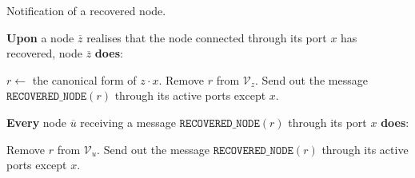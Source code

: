 \begin{algorithm}[htbp]
\caption{Notification of a recovered node.}
\label{al:nrecovery_notif}
\textbf{Upon} a node $\overline{z}$ realises that the node connected through its port $x$ has recovered, node $\overline{z}$ \textbf{does}:
     
\begin{algorithmic}[1]
	\STATE $r\leftarrow$ the canonical form of $z\cdot x$.
    \STATE Remove $r$ from $\mathcal{V}_{z}$.
    \STATE Send out the message $\texttt{RECOVERED\_NODE}(r)$ through its active ports except $x$.
\end{algorithmic}

\textbf{Every} node 
     $\overline{u}$ receiving a message $\texttt{RECOVERED\_NODE}(r)$ through its port $x$ \textbf{does}:

\begin{algorithmic}[1]
    \STATE Remove $r$ from $\mathcal{V}_{u}.$
    \STATE Send out the message $\texttt{RECOVERED\_NODE}(r)$ through its active ports except $x$.
    \ENDIF
\end{algorithmic}
\end{algorithm}